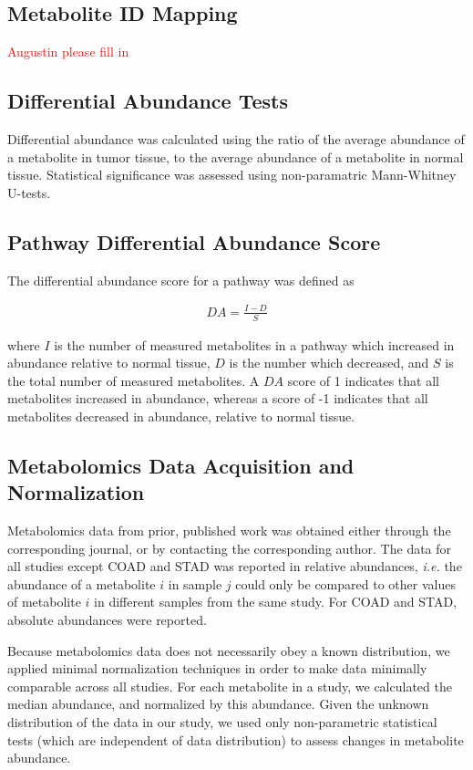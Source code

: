 \documentclass[10pt]{article}
\begin{document}
\subsection{Metabolite ID Mapping}
\textcolor{red}{Augustin please fill in}

\subsection{Differential Abundance Tests}
Differential abundance was calculated using the ratio of the average abundance of a metabolite in tumor tissue, to the average abundance of a metabolite in normal tissue. Statistical significance was assessed using non-paramatric Mann-Whitney U-tests.

\subsection{Pathway Differential Abundance Score}
The differential abundance score for a pathway was defined as

\begin{align*}
DA = \frac{I - D}{S}
\end{align*}

\noindent where $I$ is the number of measured metabolites in a pathway which increased in abundance relative to normal tissue, $D$ is the number which decreased, and $S$ is the total number of measured metabolites. A $DA$ score of 1 indicates that all metabolites increased in abundance, whereas a score of -1 indicates that all metabolites decreased in abundance, relative to normal tissue.

\subsection{Metabolomics Data Acquisition and Normalization}
Metabolomics data from prior, published work was obtained either through the corresponding journal, or by contacting the corresponding author. The data for all studies except COAD and STAD was reported in relative abundances, \textit{i.e.} the abundance of a metabolite $i$ in sample $j$ could only be compared to other values of metabolite $i$ in different samples from the same study. For COAD and STAD, absolute abundances were reported.

Because metabolomics data does not necessarily obey a known distribution, we applied minimal normalization techniques in order to make data minimally comparable across all studies. For each metabolite in a study, we calculated the median abundance, and normalized by this abundance. Given the unknown distribution of the data in our study, we used only non-parametric statistical tests (which are independent of data distribution) to assess changes in metabolite abundance.
\end{document}
